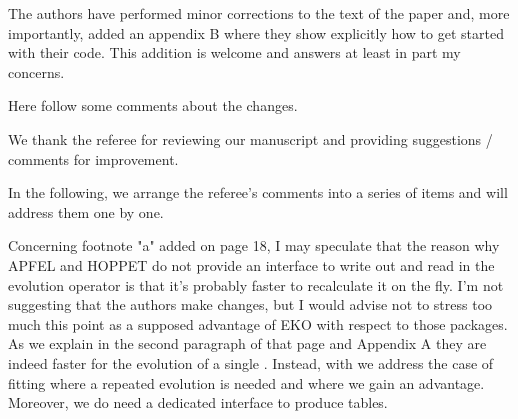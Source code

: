 \documentclass[a4paper,11pt]{article}
\newcounter{comment}[section]
\begin{document}
 


\begin{response}{
  The authors have performed minor corrections to the text of the paper and, more
importantly, added an appendix B where they show explicitly how to get started
with their code. This addition is welcome and answers at least in part my
concerns.

Here follow some comments about the changes.

}

We thank the referee for reviewing our manuscript and providing suggestions / comments for improvement.

In the following, we arrange the referee's comments into a series of items and 
will address them one by one.
\end{response}

\begin{response}{
  Concerning footnote "a" added on page 18, I may speculate that the reason why
  APFEL and HOPPET do not provide an interface to write out and read in the
  evolution operator is that it's probably faster to recalculate it on the fly.
  I'm not suggesting that the authors make changes, but I would advise not to
  stress too much this point as a supposed advantage of EKO with respect to those
  packages.
}
As we explain in the second paragraph of that page and Appendix A they are indeed faster for the evolution of a single \pdf{}.
Instead, with \eko{} we address the case of \pdf{} fitting where a repeated evolution is needed and where we gain an advantage.
Moreover, we do need a dedicated interface to produce \fk{} tables.
\end{response}
\end{document}
